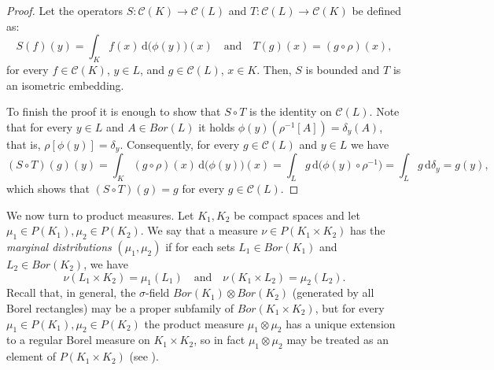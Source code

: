 \documentclass[12pt,fleqn]{amsart}
\numberwithin{equation}{section}
\theoremstyle{definition}
\newtheorem{definition}[thm]{Definition}
\def\A{\mathcal A}
\def\C{\mathcal C}
\def\ep{\varepsilon}
\begin{document}
\begin{proof}
Let the operators $S\colon \C(K)\to \C(L)$ and $T\colon \C(L)\to \C(K)$ be defined as:
\[S(f)(y)=\int_Kf(x)\,\mathrm{d}\big(\phi(y)\big)(x)\quad\text{and}\quad T(g)(x)=(g\circ\rho)(x),\]
for every $f\in \C(K)$, $y\in L$, and $g\in \C(L)$, $x\in K$. Then, $S$ is bounded and $T$ is an isometric embedding.

To finish the proof it is enough to show that $S\circ T$ is the identity on $\C(L)$. Note that for every $y\in L$ and $A\in Bor(L)$ it holds $\phi(y)(\rho^{-1}[A])=\delta_y(A)$, that is, $\rho[\phi(y)]=\delta_y$. Consequently, for every $g\in \C(L)$ and $y\in L$ we have
\[(S\circ T)(g)(y)=\int_K(g\circ\rho)(x)\,\mathrm{d}\big(\phi(y)\big)(x)=\int_Lg\,\mathrm{d}\big(\phi(y)\circ\rho^{-1}\big)=\int_Lg\,\mathrm{d}\delta_y=g(y),\]
which shows that $(S\circ T)(g)=g$ for every $g\in \C(L)$.
\end{proof}

%

We now turn to product measures. Let $K_1,K_2$ be compact spaces and let $\mu_1\in P(K_1),\mu_2\in P(K_2)$. We say that a measure $\nu\in P(K_1\times K_2)$ has the \emph{marginal distributions} $(\mu_1,\mu_2)$ if for each sets $L_1\in Bor(K_1)$ and $L_2\in Bor(K_2)$, we have
\[\nu(L_1 \times K_2)=\mu_1(L_1)\quad\text{and}\quad\nu(K_1 \times L_2)=\mu_2(L_2).\]
Recall that, in general, the $\sigma$-field $Bor(K_1)\otimes Bor(K_2)$ (generated by all Borel rectangles) may be a proper subfamily of $Bor(K_1\times K_2)$, but
for every $\mu_1\in P(K_1),\mu_2\in P(K_2)$ the product measure $\mu_1\otimes \mu_2$ has a unique extension to
a regular Borel measure on $K_1\times K_2$, so in fact $\mu_1\otimes\mu_2$ may be treated as an element of
$P(K_1\times K_2)$ (see \cite[Section 7.4]{Folland}).
\end{document}
